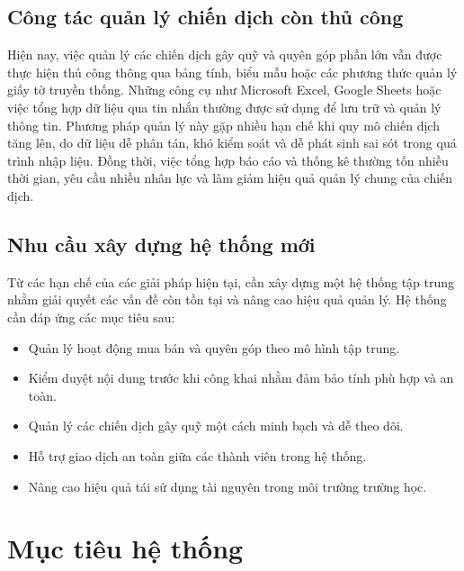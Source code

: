 \documentclass[12pt,a4paper]{report}
\begin{document}
\subsection{Công tác quản lý chiến dịch còn thủ công}

Hiện nay, việc quản lý các chiến dịch gây quỹ và quyên góp phần lớn vẫn được
thực hiện thủ công thông qua bảng tính, biểu mẫu hoặc các phương thức quản lý giấy tờ truyền thống. Những công cụ như Microsoft Excel, Google Sheets hoặc việc
tổng hợp dữ liệu qua tin nhắn thường được sử dụng để lưu trữ và quản lý thông
tin. Phương pháp quản lý này gặp nhiều hạn chế khi quy mô chiến dịch tăng lên,
do dữ liệu dễ phân tán, khó kiểm soát và dễ phát sinh sai sót trong quá trình nhập
liệu. Đồng thời, việc tổng hợp báo cáo và thống kê thường tốn nhiều thời gian, yêu
cầu nhiều nhân lực và làm giảm hiệu quả quản lý chung của chiến dịch.

\subsection{Nhu cầu xây dựng hệ thống mới}

Từ các hạn chế của các giải pháp hiện tại, cần xây dựng một hệ thống tập
trung nhằm giải quyết các vấn đề còn tồn tại và nâng cao hiệu quả quản lý. Hệ
thống cần đáp ứng các mục tiêu sau:

\begin{itemize}[label=--, leftmargin=1.2cm]

\item Quản lý hoạt động mua bán và quyên góp theo mô hình tập trung.

\item Kiểm duyệt nội dung trước khi công khai nhằm đảm bảo tính phù hợp và an toàn.

\item Quản lý các chiến dịch gây quỹ một cách minh bạch và dễ theo dõi.

\item Hỗ trợ giao dịch an toàn giữa các thành viên trong hệ thống.

\item Nâng cao hiệu quả tái sử dụng tài nguyên trong môi trường trường học.

\end{itemize}


\section{Mục tiêu hệ thống}
\end{document}
